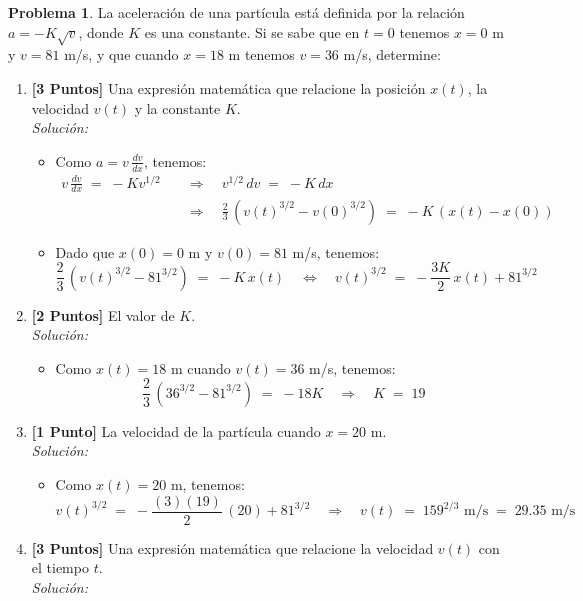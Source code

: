 \documentclass[ a4paper, twoside, 11pt]{article}
\theoremstyle{definition}
\newtheorem{problem}[definition]{Problema}
\begin{document}
\begin{problem}
La aceleraci\'on de una part\'icula est\'a definida por la relaci\'on $a = -K \sqrt{v}$, donde $K$ es una constante. Si se sabe que en $t = 0$ tenemos $x = 0$ m y $v = 81$ m/s, y que cuando $x = 18$ m tenemos $v = 36$ m/s, determine: 
\begin{enumerate}[label=\alph*.]
\item \textbf{[3 Puntos]} Una expresi\'on matem\'atica que relacione la posici\'on $x(t)$, la velocidad $v(t)$ y la constante $K$. \\ \emph{Soluci\'on:}
\begin{itemize}
\item Como $a = v \, \frac{dv}{dx}$, tenemos: 
\begin{align*}
v \, \frac{dv}{dx} \; = \; -K v^{1/2} \quad
& \Longrightarrow \quad 
v^{1/2} \, dv \; = \; -K \, dx \\
& \Longrightarrow \quad 
\frac{2}{3} \, ( v(t)^{3/2} - v(0)^{3/2} ) 
\; = \; -K \, ( x(t) - x(0) )
\end{align*}
\item Dado que $x(0) = 0$ m y $v(0) = 81$ m/s, tenemos: 
\[
\frac{2}{3} \, ( v(t)^{3/2} - 81^{3/2} ) 
\; = \; -K \, x(t) \quad \Longleftrightarrow \quad
v(t)^{3/2} \; = \; -\frac{3K}{2} \, x(t) + 81^{3/2}
\]
\end{itemize}
\item \textbf{[2 Puntos]} El valor de $K$. \\ \emph{Soluci\'on:}
\begin{itemize}
\item Como $x(t) = 18$ m cuando $v(t) = 36$ m/s, tenemos: 
\[
\frac{2}{3} \, ( 36^{3/2} - 81^{3/2} ) 
\; = \; -18K \quad \Longrightarrow \quad K \; = \; 19
\]
\end{itemize}
\item \textbf{[1 Punto]} La velocidad de la part\'icula cuando $x = 20$ m. \\ \emph{Soluci\'on:}
\begin{itemize}
\item Como $x(t) = 20$ m, tenemos: 
\[
v(t)^{3/2} \; = \; -\frac{(3)(19)}{2} \, (20) + 81^{3/2} \quad \Longrightarrow \quad 
v(t) \; = \; 159^{2/3} \text{ m/s} \; = \; 29.35 \text{ m/s}
\]
\end{itemize}
\item \textbf{[3 Puntos]} Una expresi\'on matem\'atica que relacione la velocidad $v(t)$ con el tiempo $t$. \\ \emph{Soluci\'on:}

\end{enumerate}
\end{problem}
\end{document}
